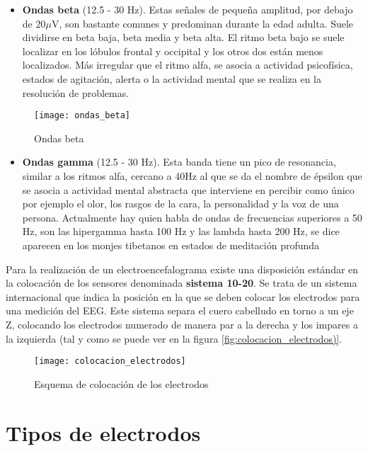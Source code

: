 \begin{itemize}
\item\textbf{Ondas beta} (12.5 - 30 Hz). Estas señales de pequeña amplitud, por debajo de 20$\mu$V, son bastante comunes y predominan durante la edad adulta. Suele dividirse en beta baja, beta media y beta alta. El ritmo beta bajo se suele localizar en los lóbulos frontal y occipital y los otros dos están menos localizados. Más irregular que el ritmo alfa, se asocia a actividad psicofísica, estados de agitación, alerta o la actividad mental que se realiza en la resolución de problemas.
\end{itemize}
\begin{figure} [H]
    \centering
    \texttt{[image: ondas\_beta]}
    \caption{Ondas beta \cite{apuntes}}
    \label{fig:ondas_beta}
\end{figure}

\begin{itemize}
\item\textbf{Ondas gamma} (12.5 - 30 Hz). Esta banda tiene un pico de resonancia, similar a los ritmos alfa, cercano a 40Hz al que se da el nombre de épsilon que se asocia a actividad mental abstracta que interviene en percibir como único por ejemplo el olor, los rasgos de la cara, la personalidad y la voz de una persona. Actualmente hay quien habla de ondas de frecuencias superiores a 50 Hz, son las hipergamma hasta 100 Hz y las lambda hasta 200 Hz, se dice aparecen en los monjes tibetanos en estados de meditación profunda
\end{itemize}

Para la realización de un electroencefalograma existe una disposición estándar en la colocación de los sensores denominada \textbf{sistema 10-20}. Se trata de un sistema internacional que indica la posición en la que se deben colocar los electrodos para una medición del EEG.  Este sistema separa el cuero cabelludo en torno a un eje Z, colocando los electrodos numerado de manera par a la derecha y los impares a la izquierda (tal y como se puede ver en la figura \ref{fig:colocacion_electrodos)}.

\begin{figure} [H]
    \centering
    \texttt{[image: colocacion\_electrodos]}
    \caption{Esquema de colocación de los electrodos}
    \label{fig:colocacion_electrodos}
\end{figure}

\clearpage

\section{Tipos de electrodos\label{sec:Tipos_Electrodos}}

